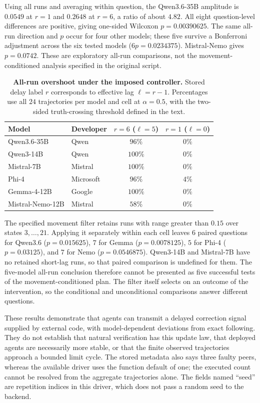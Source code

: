 \documentclass[11pt]{article}
\theoremstyle{definition}
\begin{document}
Using all runs and averaging within question, the Qwen3.6-35B amplitude is $0.0549$ at $r=1$ and
$0.2648$ at $r=6$, a ratio of about $4.82$. All eight question-level differences are positive, giving
one-sided Wilcoxon $p=0.00390625$. The same all-run direction and $p$ occur for four other models;
these five survive a Bonferroni adjustment across the six tested models ($6p=0.0234375$).
Mistral-Nemo gives $p=0.0742$. These are exploratory all-run comparisons, not the
movement-conditioned analysis specified in the original script.

\begin{table}[t]
\centering
\caption{\textbf{All-run overshoot under the imposed controller.} Stored delay label $r$ corresponds
to effective lag $\ell=r-1$. Percentages use all $24$ trajectories per model and cell at
$\alpha=0.5$, with the two-sided truth-crossing threshold defined in the text.}\label{tab:models}
\begin{tabular}{llcc}
\hline
Model & Developer & $r=6$ ($\ell=5$) & $r=1$ ($\ell=0$)\\
\hline
Qwen3.6-35B & Qwen & $96\%$ & $0\%$\\
Qwen3-14B & Qwen & $100\%$ & $0\%$\\
Mistral-7B & Mistral & $100\%$ & $0\%$\\
Phi-4 & Microsoft & $96\%$ & $4\%$\\
Gemma-4-12B & Google & $100\%$ & $0\%$\\
Mistral-Nemo-12B & Mistral & $58\%$ & $0\%$\\
\hline
\end{tabular}
\end{table}

The specified movement filter retains runs with range greater than $0.15$ over states $3,\ldots,21$.
Applying it separately within each cell leaves $6$ paired questions for Qwen3.6
($p=0.015625$), $7$ for Gemma ($p=0.0078125$), $5$ for Phi-4 ($p=0.03125$), and $7$ for Nemo
($p=0.0546875$). Qwen3-14B and Mistral-7B have no retained short-lag runs, so that paired comparison
is undefined for them. The five-model all-run conclusion therefore cannot be presented as five
successful tests of the movement-conditioned plan. The filter itself selects on an outcome of the
intervention, so the conditional and unconditional comparisons answer different questions.

These results demonstrate that agents can transmit a delayed correction signal supplied by external
code, with model-dependent deviations from exact following. They do not establish that natural
verification has this update law, that deployed agents are necessarily more stable, or that the
finite observed trajectories approach a bounded limit cycle. The stored metadata also says three
faulty peers, whereas the available driver uses the function default of one; the executed count
cannot be resolved from the aggregate trajectories alone. The fields named ``seed'' are repetition
indices in this driver, which does not pass a random seed to the backend.
\end{document}
